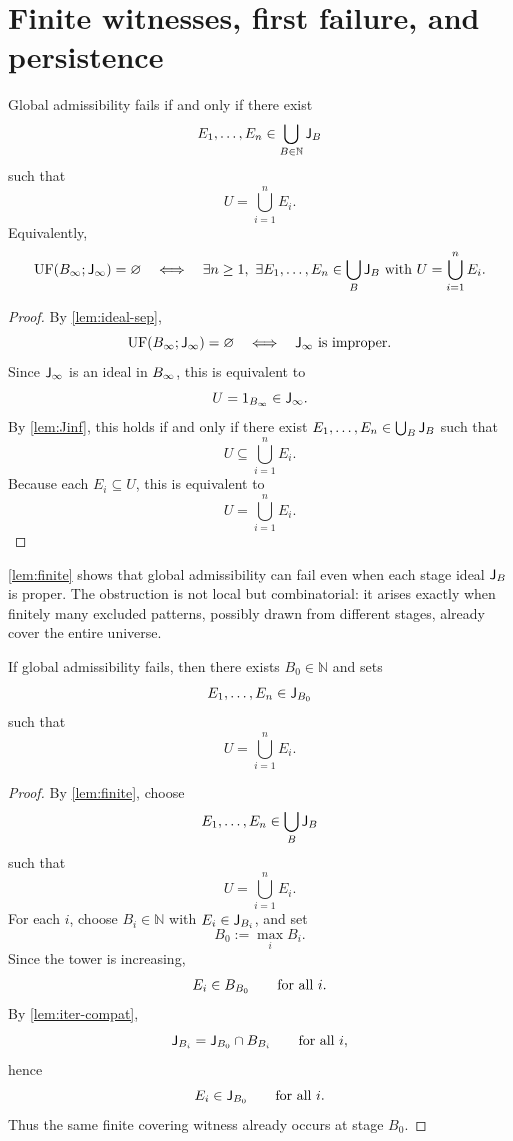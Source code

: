 \section{Finite witnesses, first failure, and persistence}
\begin{lemma}
	\label{lem:finite}
	Global admissibility fails if and only if there exist
	\[
		E_1,\dots,E_n\in\bigcup_{B\in\mathbb N}\mathsf J_B
	\]
	such that
	\[
		U=\bigcup_{i=1}^n E_i.
	\]
	Equivalently,
	\[
		\operatorname{UF}(B_\infty;\mathsf J_\infty)=\varnothing
		\quad\Longleftrightarrow\quad
		\exists n\ge1,\ \exists E_1,\dots,E_n\in\bigcup_B\mathsf J_B
		\text{ with }
		U=\bigcup_{i=1}^n E_i.
	\]
\end{lemma}
\begin{proof}
	By \cref{lem:ideal-sep},
	\[
		\operatorname{UF}(B_\infty;\mathsf J_\infty)=\varnothing
		\quad\Longleftrightarrow\quad
		\mathsf J_\infty\text{ is improper}.
	\]
	Since \(\mathsf J_\infty\) is an ideal in \(B_\infty\), this is equivalent to
	\[
		U=1_{B_\infty}\in\mathsf J_\infty.
	\]
	By \cref{lem:Jinf}, this holds if and only if there exist
	\(E_1,\dots,E_n\in\bigcup_B\mathsf J_B\) such that
	\[
		U\subseteq\bigcup_{i=1}^n E_i.
	\]
	Because each \(E_i\subseteq U\), this is equivalent to
	\[
		U=\bigcup_{i=1}^n E_i.
	\]
\end{proof}
\begin{remark}
	\cref{lem:finite} shows that global admissibility can fail even when
	each stage ideal \(\mathsf J_B\) is proper. The obstruction is not local but
	combinatorial: it arises exactly when finitely many excluded patterns,
	possibly drawn from different stages, already cover the entire universe.
\end{remark}
\begin{lemma}
	\label{lem:firstscale}
	If global admissibility fails, then there exists \(B_0\in\mathbb N\) and
	sets
	\[
		E_1,\dots,E_n\in\mathsf J_{B_0}
	\]
	such that
	\[
		U=\bigcup_{i=1}^n E_i.
	\]
\end{lemma}
\begin{proof}
	By \cref{lem:finite}, choose
	\[
		E_1,\dots,E_n\in\bigcup_B\mathsf J_B
	\]
	such that
	\[
		U=\bigcup_{i=1}^n E_i.
	\]
	For each \(i\), choose \(B_i\in\mathbb N\) with \(E_i\in\mathsf J_{B_i}\), and
	set
	\[
		B_0:=\max_i B_i.
	\]
	Since the tower is increasing,
	\[
		E_i\in B_{B_0}
		\qquad
		\text{for all }i.
	\]
	By \cref{lem:iter-compat},
	\[
		\mathsf J_{B_i}=\mathsf J_{B_0}\cap B_{B_i}
		\qquad
		\text{for all }i,
	\]
	hence
	\[
		E_i\in\mathsf J_{B_0}
		\qquad
		\text{for all }i.
	\]
	Thus the same finite covering witness already occurs at stage \(B_0\).
\end{proof}
